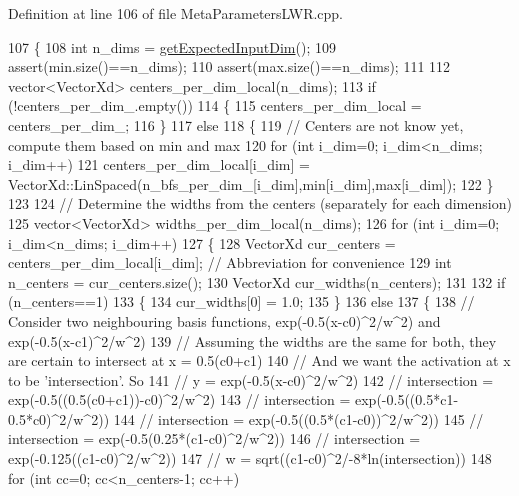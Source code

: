 Definition at line 106 of file Meta\+Parameters\+L\+W\+R.\+cpp.


\begin{DoxyCode}
107 \{
108   \textcolor{keywordtype}{int} n\_dims = \hyperlink{classDmpBbo_1_1MetaParameters_af5a550bcf65d5a29a153a594cc4e3fa1}{getExpectedInputDim}();
109   assert(min.size()==n\_dims);
110   assert(max.size()==n\_dims);
111     
112   vector<VectorXd> centers\_per\_dim\_local(n\_dims); 
113   \textcolor{keywordflow}{if} (!centers\_per\_dim\_.empty())
114   \{
115     centers\_per\_dim\_local = centers\_per\_dim\_;
116   \}
117   \textcolor{keywordflow}{else}
118   \{
119     \textcolor{comment}{// Centers are not know yet, compute them based on min and max}
120     \textcolor{keywordflow}{for} (\textcolor{keywordtype}{int} i\_dim=0; i\_dim<n\_dims; i\_dim++)
121       centers\_per\_dim\_local[i\_dim] = VectorXd::LinSpaced(n\_bfs\_per\_dim\_[i\_dim],min[i\_dim],max[i\_dim]);
122   \}
123   
124   \textcolor{comment}{// Determine the widths from the centers (separately for each dimension)}
125   vector<VectorXd> widths\_per\_dim\_local(n\_dims); 
126   \textcolor{keywordflow}{for} (\textcolor{keywordtype}{int} i\_dim=0; i\_dim<n\_dims; i\_dim++)
127   \{
128     VectorXd cur\_centers = centers\_per\_dim\_local[i\_dim]; \textcolor{comment}{// Abbreviation for convenience}
129     \textcolor{keywordtype}{int} n\_centers = cur\_centers.size();
130     VectorXd cur\_widths(n\_centers);
131 
132     \textcolor{keywordflow}{if} (n\_centers==1)
133     \{
134       cur\_widths[0] = 1.0;
135     \}
136     \textcolor{keywordflow}{else}
137     \{
138       \textcolor{comment}{// Consider two neighbouring basis functions, exp(-0.5(x-c0)^2/w^2) and exp(-0.5(x-c1)^2/w^2)}
139       \textcolor{comment}{// Assuming the widths are the same for both, they are certain to intersect at x = 0.5(c0+c1)}
140       \textcolor{comment}{// And we want the activation at x to be 'intersection'. So}
141       \textcolor{comment}{//            y = exp(-0.5(x-c0)^2/w^2)}
142       \textcolor{comment}{// intersection = exp(-0.5((0.5(c0+c1))-c0)^2/w^2)}
143       \textcolor{comment}{// intersection = exp(-0.5((0.5*c1-0.5*c0)^2/w^2))}
144       \textcolor{comment}{// intersection = exp(-0.5((0.5*(c1-c0))^2/w^2))}
145       \textcolor{comment}{// intersection = exp(-0.5(0.25*(c1-c0)^2/w^2))}
146       \textcolor{comment}{// intersection = exp(-0.125((c1-c0)^2/w^2))}
147       \textcolor{comment}{//            w = sqrt((c1-c0)^2/-8*ln(intersection))}
148       \textcolor{keywordflow}{for} (\textcolor{keywordtype}{int} cc=0; cc<n\_centers-1; cc++)

\end{DoxyCode}
